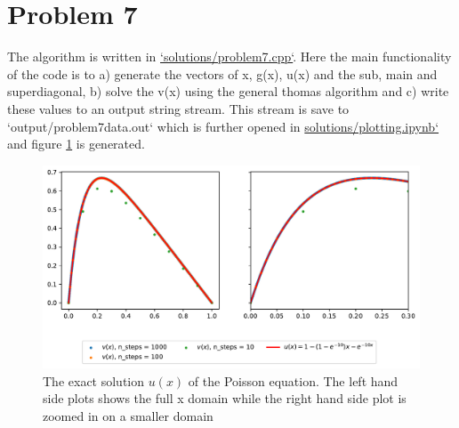 \documentclass[final, 3p, times, 11.5pt]{article}
\begin{document}
\section*{Problem 7}


The algorithm is written in \href{https://github.com/Johannesfjeldsaa/FYS3150/blob/Project1/Project1/solutions/problem7.cpp}{`solutions/problem7.cpp`}. Here the main functionality of the code is to a) generate the vectors of x, g(x), u(x) and the sub, main and superdiagonal, b) solve the v(x) using the general thomas algorithm and c) write these values to an output string stream. This stream is save to `output/problem7data.out` which is further opened in \href{https://github.com/Johannesfjeldsaa/FYS3150/blob/Project1/Project1/solutions/plotting.ipynb}{solutions/plotting.ipynb`} and figure \ref{fig:problem7} is generated.

\begin{figure}[h!]
    \centering
    \includegraphics[width=0.6\linewidth]{Project 1/Figurer/problem7fig.pdf}
    \caption{The exact solution $u(x)$ of the Poisson equation. The left hand side plots shows the full x domain while the right hand side plot is zoomed in on a smaller domain}
    \label{fig:problem7}
\end{figure}
\end{document}
